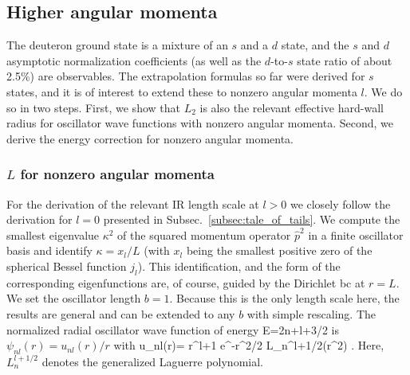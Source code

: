 	\subsection{Higher angular momenta}
	\label{subsec:higher_angular_momenta}

	The deuteron ground state is a mixture of an $s$ and a $d$ state, and
	the $s$ and $d$ asymptotic normalization coefficients (as well as the
	$d$-to-$s$ state ratio of about 2.5\%) are observables.  The
	extrapolation formulas so far were derived for $s$
	states, and it is of interest to extend these to nonzero angular
	momenta $l$.  We do so in two steps.  First, we show that $L_2$ is also
	the relevant effective hard-wall radius for oscillator wave functions
	with nonzero angular momenta.  Second, we derive the energy correction
	for nonzero angular momenta.

	\subsubsection{$L$ for nonzero angular momenta}

	For the derivation of the relevant IR length scale at $l>0$ we closely
	follow the derivation for $l=0$ presented in
	Subsec.~\ref{subsec:tale_of_tails}.  We compute the smallest eigenvalue
	$\kappa^2$ of the squared momentum operator $\hat{p}^2$ in a finite
	oscillator basis and identify $\kappa =x_l/L$ (with $x_l$ being the
	smallest positive zero of the spherical Bessel function $j_l$). This
	identification, and the form of the corresponding eigenfunctions are,
	of course, guided by the Dirichlet bc at $r=L$.  We set the oscillator
	length $b=1$.  Because this is the only length scale here, the results
	are general and can be extended to any $b$ with simple rescaling.
	The normalized radial	oscillator wave function of energy
	\beq
	  E=2n+l+3/2
	\eeq
	is   $\psi_{nl}(r)=u_{nl}(r)/r$ with
	\beq
	u_{nl}(r)= r^{l+1} e^{-r^2/2}
	L_{n}^{l+1/2}(r^2) \;.
	\eeq
	Here, $L_n^{l+1/2}$ denotes the generalized Laguerre polynomial.

